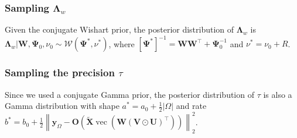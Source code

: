 \documentclass[12pt]{article}
\newcommand{\bd}[1]{\boldsymbol{#1}}
\begin{document}
\subsubsection{Sampling $\boldsymbol{\Lambda}_{w}$}
Given the conjugate Wishart prior, the posterior distribution of $\boldsymbol{\Lambda}_{w}$ is $\left.\boldsymbol{\Lambda}_{w}\right|\boldsymbol{W},\boldsymbol{\Psi}_{0},\nu_{0}\sim\mathcal{W}\left(\boldsymbol{\Psi}^{*},\nu^{*}\right)$, %
where $[\boldsymbol{\Psi}^{*}]^{-1}=\boldsymbol{W}\boldsymbol{W}^{\top}+\boldsymbol{\Psi}_{0}^{-1}$ and $\nu^{*}=\nu_{0}+R$.


\subsubsection{Sampling the precision $\tau$}
Since we used a conjugate Gamma prior, the posterior distribution of $\tau$ is also a Gamma distribution with shape ${a^{*}=a_{0}+\frac{1}{2}|\Omega|}$ and rate ${b^{*}=b_{0}+\frac{1}{2}\left\|\boldsymbol{y}_{\Omega}-\boldsymbol{O}\left(\tilde{\bd{X}}\operatorname{vec}\left(\boldsymbol{W}(\boldsymbol{V}\odot\boldsymbol{U})^{\top}\right)\right)\right\|_{2}^{2}}$.
\end{document}
